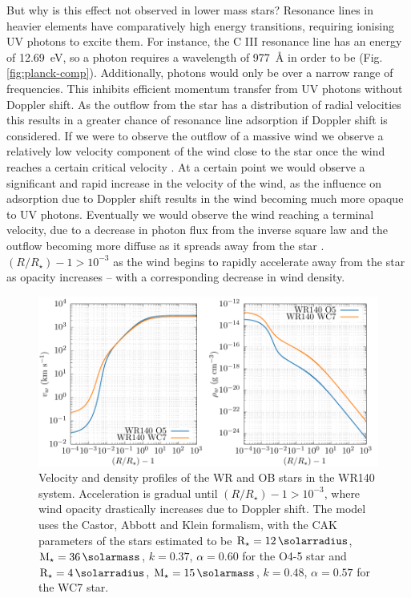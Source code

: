But why is this effect not observed in lower mass stars?
Resonance lines in heavier elements have comparatively high energy transitions, requiring ionising UV photons to excite them. 
For instance, the C III resonance line has an energy of \SI{12.69}{\electronvolt}, so a photon requires a wavelength of \SI{977}{\angstrom} in order to be  (Fig. {\ref{fig:planck-comp}}).
Additionally, photons would only be  over a narrow range of frequencies.
This inhibits efficient momentum transfer from UV photons without Doppler shift.
As the outflow from the star has a distribution of radial velocities this results in a greater chance of resonance line adsorption if Doppler shift is considered.
If we were to observe the outflow of a massive wind we observe a relatively low velocity component of the wind close to the star once the wind reaches a certain critical velocity .
At a certain point we would observe a significant and rapid increase in the velocity of the wind, as the influence on adsorption due to Doppler shift results in the wind becoming much more opaque to UV photons.
Eventually we would observe the wind reaching a terminal velocity, due to a decrease in photon flux from the inverse square law and the outflow becoming more diffuse as it spreads away from the star .
 $(R/R_\star) - 1 > 10^{-3}$ as the wind begins to rapidly accelerate away from the star as opacity increases -- with a corresponding decrease in wind density.

\begin{figure}[h]
  \centering
  \includegraphics[]{assets/cak/vel.pdf}
  \caption[Radiative line driving velocity and density profile]{Velocity and density profiles of the WR and OB stars in the WR140 system. Acceleration is gradual until $(R/R_\star) - 1 > 10^{-3}$, where wind opacity drastically increases due to Doppler shift. The model uses the Castor, Abbott and Klein formalism, with the CAK parameters of the stars estimated to be $\text{R}_\star = \SI{12}{\solarradius}$, $\mass_\star = \SI{36}{\solarmass}$, $k = 0.37$, $\alpha = 0.60$ for the O4-5 star and $\text{R}_\star = \SI{4}{\solarradius}$, $\mass_\star = \SI{15}{\solarmass}$, $k = 0.48$, $\alpha = 0.57$ for the WC7 star.}
  \label{fig:cak-vel}
\end{figure}

